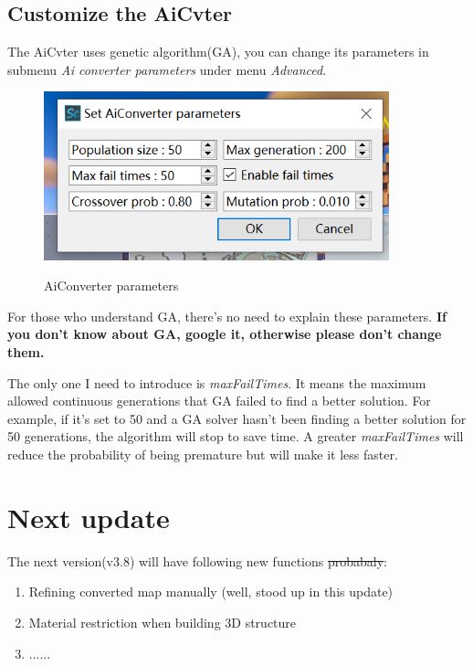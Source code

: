 \documentclass{article}
\begin{document}
    \subsection{Customize the AiCvter}
    \label{CustomizeAiCvter}
    The AiCvter uses genetic algorithm(GA), you can change its parameters in submenu \textit{Ai converter parameters} under menu \textit{Advanced}.

    \begin{figure}[htbp]
        \centering
        \includegraphics[width=10cm]{Img13_AiCvterPara.png}
        \label{GAOpt}
        \caption{AiConverter parameters}
    \end{figure}

    For those who understand GA, there's no need to explain these parameters. \textbf{If you don't know about GA, google it, otherwise please don't change them.}

    The only one I need to introduce is \textit{maxFailTimes}. It means the maximum allowed continuous generations that GA failed to find a better solution. For example, if it's set to 50 and a GA solver hasn't been finding a better solution for 50 generations, the algorithm will stop to save time. A greater \textit{maxFailTimes} will reduce the probability of being premature but will make it less faster.

    
\pagebreak
\section{Next update}
    The next version(v3.8) will have following new functions \st{probabaly}:
    \begin{enumerate}
        \item Refining converted map manually (well, stood up in this update)
        \item Material restriction when building 3D structure
        \item ......
    \end{enumerate}
\end{document}
